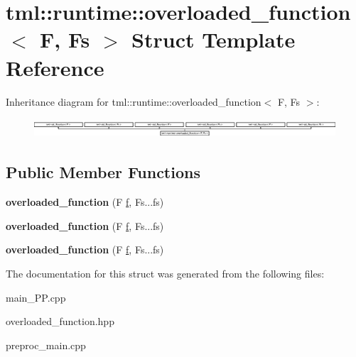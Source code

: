 \hypertarget{structtml_1_1runtime_1_1overloaded__function}{\section{tml\+:\+:runtime\+:\+:overloaded\+\_\+function$<$ F, Fs $>$ Struct Template Reference}
\label{structtml_1_1runtime_1_1overloaded__function}
}
Inheritance diagram for tml\+:\+:runtime\+:\+:overloaded\+\_\+function$<$ F, Fs $>$\+:\begin{figure}[H]
\begin{center}
\leavevmode
\includegraphics[height=0.720721cm]{structtml_1_1runtime_1_1overloaded__function}
\end{center}
\end{figure}
\subsection*{Public Member Functions}
\begin{DoxyCompactItemize}
\item 
\hypertarget{structtml_1_1runtime_1_1overloaded__function_a63df60f5abad8ca103bb3e8669d08845}{{\bfseries overloaded\+\_\+function} (F \hyperlink{structf}{f}, Fs...\+fs)}\label{structtml_1_1runtime_1_1overloaded__function_a63df60f5abad8ca103bb3e8669d08845}

\item 
\hypertarget{structtml_1_1runtime_1_1overloaded__function_a63df60f5abad8ca103bb3e8669d08845}{{\bfseries overloaded\+\_\+function} (F \hyperlink{structf}{f}, Fs...\+fs)}\label{structtml_1_1runtime_1_1overloaded__function_a63df60f5abad8ca103bb3e8669d08845}

\item 
\hypertarget{structtml_1_1runtime_1_1overloaded__function_a63df60f5abad8ca103bb3e8669d08845}{{\bfseries overloaded\+\_\+function} (F \hyperlink{structf}{f}, Fs...\+fs)}\label{structtml_1_1runtime_1_1overloaded__function_a63df60f5abad8ca103bb3e8669d08845}

\end{DoxyCompactItemize}


The documentation for this struct was generated from the following files\+:\begin{DoxyCompactItemize}
\item 
main\+\_\+\+P\+P.\+cpp\item 
overloaded\+\_\+function.\+hpp\item 
preproc\+\_\+main.\+cpp\end{DoxyCompactItemize}
